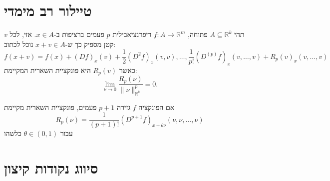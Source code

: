 \documentclass{tstextbook}
\begin{document}
\section{טיילור רב מימדי}

\begin{theorem}[טיילור]
תהי \(A\subseteq \mathbb{R}^k\) פתוחה, \(f:A\to\mathbb{R}^m\) דיפרנציאבילית \(p\) פעמים ברציפות ב-\(x \in A\). אזי, לכל \(v\) קטן מספיק כך ש-\(x+v\in A\) נוכל לכתוב:
$$\!\!\!\!f\left(x+v\right)\!=\!f\left(x\right)\!+\!\left(D f\right)_{x}\left(v\right)\!+\!\frac12\left(D^{2}f\right)_{x}\left(v,v\right),\ldots,\frac1{p!}\left(D^{(p)}f\right)_{x}\left(v,\ldots,v\right)\!+\!R_{p}\left(v\right)_{x}\left(v,\ldots,v\right)$$
כאשר \(R_{p}(v)\) היא פונקציית השארית המקיימת:
$$\operatorname*{lim}_{\nu\to0}{\frac{R_{p}(\nu)}{\|\nu\|_{\mathbb{R}^{k}}^{p}}}=0.$$

\end{theorem}
\begin{theorem}
אם הפונקציה \(f\) גזירה \(p+1\) פעמים, פונקציית השארית מקיימת 
$$R_{p}(\nu)=\frac{1}{(p+1)!}({D}^{p+1}f)_{x+\theta\nu}(\nu,\nu,\ldots,\nu)$$
עבור \(\theta \in(0,1)\) כלשהו

\end{theorem}
\section{סיווג נקודות קיצון}
\end{document}
